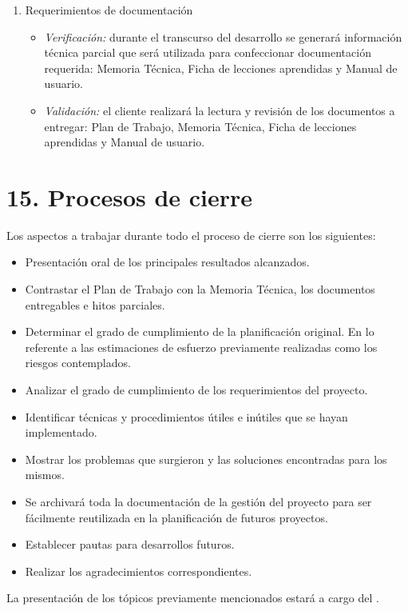 \documentclass[
11pt, %
]{charter}
\begin{document}
\begin{enumerate}
	\item Requerimientos de documentación
	\begin{itemize}
		\item \emph{Verificación:} durante el transcurso del desarrollo se generará información técnica parcial que será utilizada para confeccionar documentación requerida: Memoria Técnica, Ficha de lecciones aprendidas y Manual de usuario. 
		\item \emph{Validación:} el cliente realizará la lectura y revisión de los documentos a entregar: Plan de Trabajo, Memoria Técnica, Ficha de lecciones aprendidas y Manual de usuario.
	\end{itemize}
\end{enumerate}

\clearpage

\section{15. Procesos de cierre}    
\label{sec:cierre}

Los aspectos a trabajar durante todo el proceso de cierre son los siguientes:

\begin{itemize}
	\item Presentación oral de los principales resultados alcanzados.
	\item Contrastar el Plan de Trabajo con la Memoria Técnica, los documentos entregables e hitos parciales.
	\item Determinar el grado de cumplimiento de la planificación original. En lo referente a las estimaciones de esfuerzo previamente realizadas como los riesgos contemplados.
	\item Analizar el grado de cumplimiento de los requerimientos del proyecto.
	\item Identificar técnicas y procedimientos útiles e inútiles que se hayan implementado.
	\item Mostrar los problemas que surgieron y las soluciones encontradas para los mismos. 
	\item Se archivará toda la documentación de la gestión del proyecto para ser fácilmente reutilizada en la planificación de futuros proyectos.
	\item Establecer pautas para desarrollos futuros.
	\item Realizar los agradecimientos correspondientes.
\end{itemize}

La presentación de los tópicos previamente mencionados estará a cargo del \authortittle \authorname.
\end{document}

